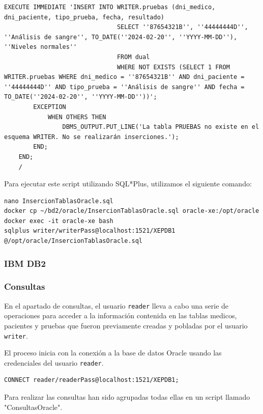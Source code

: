 \documentclass{article}
\begin{document}
\begin{lstlisting}[style=bashStyle]
            EXECUTE IMMEDIATE 'INSERT INTO WRITER.pruebas (dni_medico, dni_paciente, tipo_prueba, fecha, resultado)
                               SELECT ''87654321B'', ''44444444D'', ''Análisis de sangre'', TO_DATE(''2024-02-20'', ''YYYY-MM-DD''), ''Niveles normales''
                               FROM dual
                               WHERE NOT EXISTS (SELECT 1 FROM WRITER.pruebas WHERE dni_medico = ''87654321B'' AND dni_paciente = ''44444444D'' AND tipo_prueba = ''Análisis de sangre'' AND fecha = TO_DATE(''2024-02-20'', ''YYYY-MM-DD''))';
        EXCEPTION
            WHEN OTHERS THEN
                DBMS_OUTPUT.PUT_LINE('La tabla PRUEBAS no existe en el esquema WRITER. No se realizarán inserciones.');
        END;
    END;
    /
\end{lstlisting}

Para ejecutar este script utilizando SQL*Plus, utilizamos el siguiente comando:

\begin{lstlisting}[style=bashStyle]
nano InsercionTablasOracle.sql
docker cp ~/bd2/oracle/InsercionTablasOracle.sql oracle-xe:/opt/oracle
docker exec -it oracle-xe bash
sqlplus writer/writerPass@localhost:1521/XEPDB1
@/opt/oracle/InsercionTablasOracle.sql
\end{lstlisting}

\subsubsection{IBM DB2}



\subsubsection{Consultas}

En el apartado de consultas, el usuario \texttt{reader} lleva a cabo una serie de operaciones para acceder a la información contenida en las tablas medicos, pacientes y pruebas que fueron previamente creadas y pobladas por el usuario \texttt{writer}. 

El proceso inicia con la conexión a la base de datos Oracle usando las credenciales del usuario \texttt{reader}. 

\begin{lstlisting}[style=bashStyle]
CONNECT reader/readerPass@localhost:1521/XEPDB1;
\end{lstlisting}

Para realizar las consultas han sido agrupadas todas ellas en un script llamado "ConsultasOracle".
\end{document}
